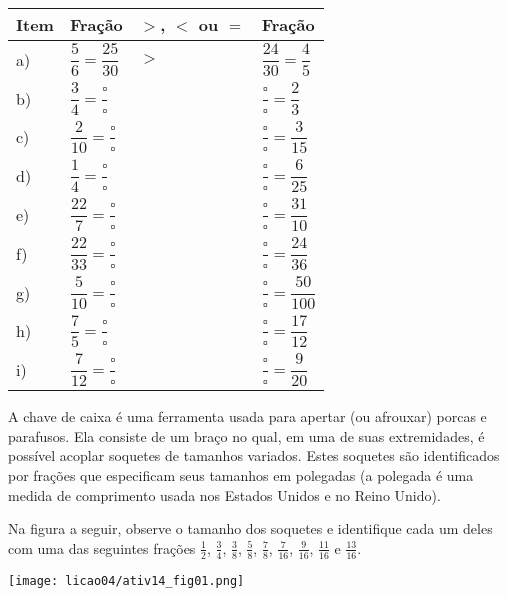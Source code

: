 \begin{atividade}{}
\begin{center}
  \begin{longtable}{|	m{}|m{}|m{}|m{}|}
    \hline
     Item &  Fração &  $>$, $<$ ou $=$ &  Fração \\
    \hline \hline
     a) & \parbox[b][1.2cm][c]{3cm}{ $\dfrac{5}{6} = \dfrac{25}{30}$ } &   $>$&  $\dfrac{24}{30} = \dfrac{4}{5}$ \\
    \hline
     b) & \parbox[b][1.2cm][c]{3cm}{ $\dfrac{3}{4} = \dfrac{\square}{\square}$} &   &  $\dfrac{\square}{\square} = \dfrac{2}{3}$ \\
    \hline
     c) &  \parbox[b][1.2cm][c]{3cm}{$\dfrac{2}{10} = \dfrac{\square}{\square}$} &   &  $\dfrac{\square}{\square} = \dfrac{3}{15}$ \\
    \hline
     d) & \parbox[b][1.2cm][c]{3cm}{ $\dfrac{1}{4} = \dfrac{\square}{\square}$} &   &  $\dfrac{\square}{\square} = \dfrac{6}{25}$ \\
    \hline
     e) & \parbox[b][1.2cm][c]{3cm}{ $\dfrac{22}{7} = \dfrac{\square}{\square}$} &  &  $\dfrac{\square}{\square} = \dfrac{31}{10}$ \\
    \hline
     f) & \parbox[b][1.2cm][c]{3cm}{ $\dfrac{22}{33} = \dfrac{\square}{\square}$} &   &  $\dfrac{\square}{\square} = \dfrac{24}{36}$ \\
    \hline
     g) & \parbox[b][1.2cm][c]{3cm}{ $\dfrac{5}{10} = \dfrac{\square}{\square}$} &   &  $\dfrac{\square}{\square} = \dfrac{50}{100}$ \\
    \hline
     h) & \parbox[b][1.2cm][c]{3cm}{ $\dfrac{7}{5} = \dfrac{\square}{\square}$} &  &  $\dfrac{\square}{\square} = \dfrac{17}{12}$ \\
    \hline
     i) & \parbox[b][1.2cm][c]{3cm}{ $\dfrac{7}{12} = \dfrac{\square}{\square}$} &  &  $\dfrac{\square}{\square} = \dfrac{9}{20}$ \\
    \hline
  \end{longtable}
\end{center}
\end{atividade}

\begin{atividade}{}


A chave de caixa é uma ferramenta usada para apertar (ou afrouxar) porcas e parafusos. Ela consiste
de um braço no qual, em uma de suas extremidades, é possível acoplar soquetes de tamanhos variados.
Estes soquetes são identificados por frações que especificam seus tamanhos em polegadas (a polegada é uma medida de comprimento usada nos Estados Unidos e no Reino Unido).

Na figura a seguir, observe o tamanho dos soquetes e identifique cada um deles com uma das seguintes frações $\frac{1}{2}$, $\frac{3}{4}$, $\frac{3}{8}$, $\frac{5}{8}$, $\frac{7}{8}$, $\frac{7}{16}$, $\frac{9}{16}$, $\frac{11}{16}$ e $\frac{13}{16}$.

\begin{center}
    \texttt{[image: licao04/ativ14\_fig01.png]}
\end{center}

\end{atividade}

